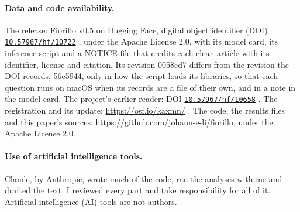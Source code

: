 \documentclass[11pt,letterpaper]{article}
\newcommand{\doi}[1]{\href{https://doi.org/#1}{\nolinkurl{#1}}}
\newcommand{\idn}[1]{#1}%
\begin{document}
\paragraph{Data and code availability.} The release: Fiorillo v0.5 on Hugging Face, digital object identifier (DOI) \doi{10.57967/hf/10722} \citep{fiorillo05}, under the Apache License 2.0, with its model card, its inference script and a NOTICE file that credits each clean article with its identifier, license and citation. Its revision \idn{0058ed7} differs from the revision the DOI records, \idn{56e5944}, only in how the script loads its libraries, so that each question runs on macOS when its records are a file of their own, and in a note in the model card. The project's earlier reader: DOI \doi{10.57967/hf/10658} \citep{reader1}. The registration and its update: \mbox{\url{https://osf.io/kaxmn/}} \citep{osfreg}. The code, the results files and this paper's sources: \mbox{\url{https://github.com/johann-e-li/fiorillo}}, under the Apache License 2.0.

\paragraph{Use of artificial intelligence tools.} Claude, by Anthropic, wrote much of the code, ran the analyses with me and drafted the text. I reviewed every part and take responsibility for all of it. Artificial intelligence (AI) tools are not authors.
\end{document}
